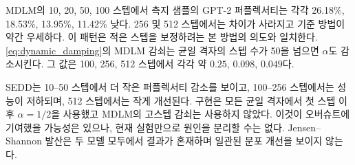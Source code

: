 MDLM의 10, 20, 50, 100 스텝에서 측지 샘플의 GPT-2 퍼플렉서티는 각각 26.18\%,
18.53\%, 13.95\%, 11.42\% 낮다. 256 및 512 스텝에서는 차이가 사라지고 기준 방법이 약간
우세하다. 이 패턴은 적은 스텝을 보정하려는 본 방법의 의도와 일치한다.
\cref{eq:dynamic_damping}의 MDLM 감쇠는 균일 격자의
스텝 수가 50을 넘으면 $\alpha$도 감소시킨다. 그 값은 100, 256, 512 스텝에서 각각 약
$0.25$, $0.098$, $0.049$다.

SEDD는 10--50 스텝에서 더 작은 퍼플렉서티 감소를 보이고, 100--256 스텝에서는 성능이
저하되며, 512 스텝에서는 작게 개선된다. 구현은 모든 균일 격자에서 첫 스텝 이후
$\alpha=1/2$을 사용했고 MDLM의 고스텝 감쇠는 사용하지 않았다. 이것이 오버슈트에 기여했을
가능성은 있으나, 현재 실험만으로 원인을 분리할 수는 없다. Jensen--Shannon 발산은 두 모델
모두에서 결과가 혼재하며 일관된 분포 개선을 보이지 않는다.
